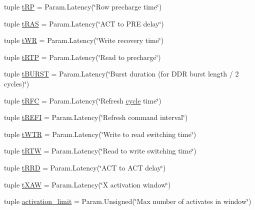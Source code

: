 \begin{DoxyCompactItemize}
\item 
tuple \hyperlink{classDRAMCtrl_1_1DRAMCtrl_a3fd4b7863d0675623f9d4fcf4e7e261b}{tRP} = Param.Latency(\char`\"{}Row precharge time\char`\"{})
\item 
tuple \hyperlink{classDRAMCtrl_1_1DRAMCtrl_a1d18debfcaf49a125143125e9471c488}{tRAS} = Param.Latency(\char`\"{}ACT to PRE delay\char`\"{})
\item 
tuple \hyperlink{classDRAMCtrl_1_1DRAMCtrl_a697ccc69ed7565c11123843aa79fc126}{tWR} = Param.Latency(\char`\"{}Write recovery time\char`\"{})
\item 
tuple \hyperlink{classDRAMCtrl_1_1DRAMCtrl_a3498a796c766f5549f38ec67b86afbb2}{tRTP} = Param.Latency(\char`\"{}Read to precharge\char`\"{})
\item 
tuple \hyperlink{classDRAMCtrl_1_1DRAMCtrl_a8c64ef2dd5b5213f7c25ecffd077591f}{tBURST} = Param.Latency(\char`\"{}Burst duration (for DDR burst length / 2 cycles)\char`\"{})
\item 
tuple \hyperlink{classDRAMCtrl_1_1DRAMCtrl_a11b9ca2212339997f0ee9282bef043ea}{tRFC} = Param.Latency(\char`\"{}Refresh \hyperlink{classClockedObject_a5dd7a975aae396561aafab3faa698033}{cycle} time\char`\"{})
\item 
tuple \hyperlink{classDRAMCtrl_1_1DRAMCtrl_abe6e6760f393c9748af2550b3f80fef8}{tREFI} = Param.Latency(\char`\"{}Refresh command interval\char`\"{})
\item 
tuple \hyperlink{classDRAMCtrl_1_1DRAMCtrl_aab12a5441587fc9009b2cd7b83865f92}{tWTR} = Param.Latency(\char`\"{}Write to read switching time\char`\"{})
\item 
tuple \hyperlink{classDRAMCtrl_1_1DRAMCtrl_ae9c14c1c8f7db3710dff2c3f7477dd73}{tRTW} = Param.Latency(\char`\"{}Read to write switching time\char`\"{})
\item 
tuple \hyperlink{classDRAMCtrl_1_1DRAMCtrl_aea95c8f8e95256590d16b5e9bcca1f51}{tRRD} = Param.Latency(\char`\"{}ACT to ACT delay\char`\"{})
\item 
tuple \hyperlink{classDRAMCtrl_1_1DRAMCtrl_a7de8ac1f9497dea29b2aaab67a0fb1cc}{tXAW} = Param.Latency(\char`\"{}X activation window\char`\"{})
\item 
tuple \hyperlink{classDRAMCtrl_1_1DRAMCtrl_a96b5e1268f3ab4cfa8c9203598fd98c9}{activation\_\-limit} = Param.Unsigned(\char`\"{}Max number of activates in window\char`\"{})
\end{DoxyCompactItemize}


